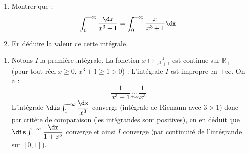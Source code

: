 \documentclass[a4paper,10pt]{report}
\begin{document}
\begin{Exercice}{}
\begin{enumerate}
  \item
    Montrer que :
    \[
\int_{0}^{ + \infty} \frac{\d x}{x^{3} + 1} = \int_{0}^{ + \infty} \frac{x}{x^{3} + 1}\dx
    \]
  \item
    En déduire la valeur de cette intégrale.
  \end{enumerate}
\end{Exercice} 

\corr 

\begin{enumerate}
\item Notons $I$ la première intégrale. La fonction $x \mapsto \frac{1}{x^{3} + 1}$ est continue sur $\mathbb{R}_+$ (pour tout réel $x \geq 0$, $x^3+1 \geq 1>0$) : L'intégrale $I$ est impropre en $+ \infty$. On a :
$$  \frac{1}{x^{3} + 1} \underset{+ \infty}{\sim} \dfrac{1}{x^3} $$
L'intégrale $\dis \int_1^{+\infty} \dfrac{\dx}{x^3}$ converge (intégrale de Riemann avec $3>1$) donc par critère de comparaison (les intégrandes sont positives), on en déduit que $\dis \int_1^{+\infty} \dfrac{\dx}{1+x^3}$ converge et ainsi $I$ converge (par continuité de l'intégrande sur $[0,1]$). 

\medskip


\end{enumerate}
\end{document}
